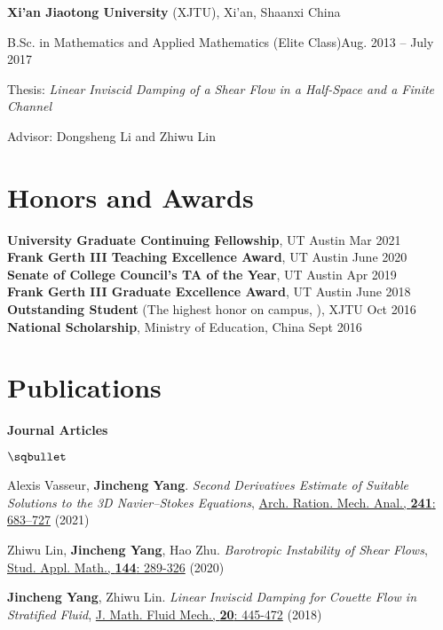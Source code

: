\documentclass[margin,line]{res}
\newenvironment{list1}{
  \begin{list}{}{%
      \setlength{\itemsep}{0.02in}
      \setlength{\parsep}{0in} 
      \setlength{\parskip}{0in}
      \setlength{\topsep}{0.1in}
      \setlength{\partopsep}{-0.07in} 
      \setlength{\leftmargin}{0.15in}
    }}
{\end{list}}
\newenvironment{list2}{
  \begin{list}{$\sqbullet$}{%
      \setlength{\itemsep}{0.05in}
      \setlength{\parsep}{0in} 
      \setlength{\parskip}{0in}
      \setlength{\topsep}{0.1in} 
      \setlength{\partopsep}{-0.07in} 
      \setlength{\leftmargin}{0.15in}
    }}
{\end{list}}
\begin{document}
\begin{resume}
{\bf Xi'an Jiaotong University} (XJTU), Xi'an, Shaanxi China
\begin{list1}
\item B.Sc. in Mathematics and Applied Mathematics (Elite Class)\hfill Aug. 2013 -- July 2017
\item Thesis: \textit{Linear Inviscid Damping of a Shear Flow in a Half-Space and a Finite Channel}
\item Advisor: Dongsheng Li and Zhiwu Lin
\end{list1}

\section{\sc Honors and Awards} 
{\bf University Graduate Continuing Fellowship}, 
UT Austin \hfill {Mar 2021}\\
{\bf Frank Gerth III Teaching Excellence Award}, 
UT Austin \hfill {June 2020}\\
{\bf Senate of College Council's TA of the Year}, 
UT Austin \hfill {Apr 2019}\\
{\bf Frank Gerth III Graduate Excellence Award}, 
UT Austin \hfill {June 2018}\\
{\bf Outstanding Student} 
(The highest honor on campus, ),
XJTU \hfill {Oct 2016}\\
{\bf National Scholarship},
Ministry of Education, China \hfill {Sept 2016}

\section{\sc Publications}

{\bf Journal Articles}

\begin{list2}
    
    \item Alexis Vasseur, \textbf{Jincheng Yang}. \textit{Second Derivatives Estimate of Suitable Solutions to the 3D Navier--Stokes Equations},  \href{https://doi.org/10.1007/s00205-021-01661-4}{Arch. Ration. Mech. Anal., \textbf{241}: 683–727} (2021)

    \item Zhiwu Lin, \textbf{Jincheng Yang}, Hao Zhu. \textit{Barotropic Instability of Shear Flows}, 
    \href{https://doi.org/10.1111/sapm.12297}{Stud. Appl. Math., \textbf{144}: 289-326} (2020)
    
    \item \textbf{Jincheng Yang}, Zhiwu Lin. \textit{Linear Inviscid Damping for Couette Flow in Stratified Fluid}, \href{https://doi.org/10.1007/s00021-017-0328-3}{J. Math. Fluid Mech., \textbf{20}: 445-472} (2018)


\end{list2}
\end{resume}
\end{document}
